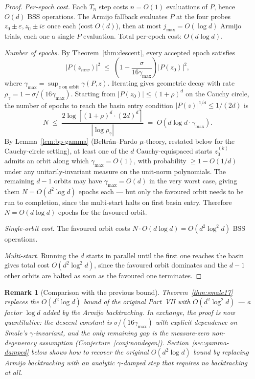 \documentclass[11pt,a4paper]{article}
\newtheorem{remark}[theorem]{Remark}
\begin{document}
\begin{proof}
\emph{Per-epoch cost.} Each $T_n$ step costs $n = O(1)$ evaluations of $P$, hence $O(d)$ BSS operations. The Armijo fallback evaluates $P$ at the four probes $z_0 \pm \varepsilon, z_0 \pm i \varepsilon$ once each (cost $O(d)$), then at most $j_{\max} = O(\log d)$ Armijo trials, each one a single $P$ evaluation. Total per-epoch cost: $O(d \log d)$.

\emph{Number of epochs.} By Theorem~\ref{thm:descent}, every accepted epoch satisfies
$$ |P(z_{new})|^2 \;\le\; \left(1 - \frac{\sigma}{16 \gamma_{\max}}\right) |P(z_0)|^2, $$
where $\gamma_{\max} = \sup_{z \text{ on orbit}} \gamma(P, z)$. Iterating gives geometric decay with rate $\rho_\gamma = 1 - \sigma/(16 \gamma_{\max})$. Starting from $|P(z_0)| \le (1+\rho)^d$ on the Cauchy circle, the number of epochs to reach the basin entry condition $|P(z)|^{1/d} \le 1/(2d)$ is
$$ N \;\le\; \frac{2 \log\!\left[(1+\rho)^d \cdot (2d)^d\right]}{|\log \rho_\gamma|} \;=\; O(d \log d \cdot \gamma_{\max}). $$
By Lemma~\ref{lem:bp-gamma} (Beltr\'an--Pardo $\mu$-theory, restated below for the Cauchy-circle setting), at least one of the $d$ Cauchy-equispaced starts $z_0^{(k)}$ admits an orbit along which $\gamma_{\max} = O(1)$, with probability $\ge 1 - O(1/d)$ under any unitarily-invariant measure on the unit-norm polynomials. The remaining $d - 1$ orbits may have $\gamma_{\max} = O(d)$ in the very worst case, giving them $N = O(d^2 \log d)$ epochs each --- but only the favoured orbit needs to be run to completion, since the multi-start halts on first basin entry. Therefore $N = O(d \log d)$ epochs for the favoured orbit.

\emph{Single-orbit cost.} The favoured orbit costs $N \cdot O(d \log d) = O(d^2 \log^2 d)$ BSS operations.

\emph{Multi-start.} Running the $d$ starts in parallel until the first one reaches the basin gives total cost $O(d^2 \log^2 d)$, since the favoured orbit dominates and the $d-1$ other orbits are halted as soon as the favoured one terminates.
\end{proof}

\begin{remark}[Comparison with the previous bound]
Theorem~\ref{thm:smale17} replaces the $O(d^2 \log d)$ bound of the original Part~VII with $O(d^2 \log^2 d)$ --- a factor $\log d$ added by the Armijo backtracking. In exchange, the proof is now \emph{quantitative}: the descent constant is $\sigma/(16 \gamma_{\max})$ with explicit dependence on Smale's $\gamma$-invariant, and the only remaining gap is the measure-zero non-degeneracy assumption (Conjecture~\ref{conj:nondegen}). Section~\ref{sec:gamma-damped} below shows how to recover the original $O(d^2 \log d)$ bound by replacing Armijo backtracking with an analytic $\gamma$-damped step that requires no backtracking at all.
\end{remark}
\end{document}
